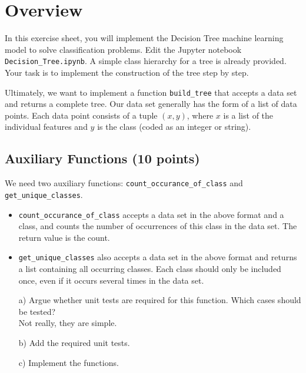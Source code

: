 \def\firstname{Tim}
\def\lastname{Dahmen}
\def\aufgabenblatt{2}




\thispagestyle{page1} 

\section{Overview}

In this exercise sheet, you will implement the Decision Tree machine learning model to solve classification problems. 
Edit the Jupyter notebook \texttt{Decision\_Tree.ipynb}. A simple class hierarchy for a tree is already provided.
Your task is to implement the construction of the tree step by step. 

Ultimately, we want to implement a function \texttt{build\_tree} that accepts a data set and returns a complete tree. 
Our data set generally has the form of a list of data points. Each data point consists of a tuple $(x,y)$, where $x$ is a list of the individual features and $y$ is the class (coded as an integer or string). 

\subsection{Auxiliary Functions (10 points)}

We need two auxiliary functions: \texttt{count\_occurance\_of\_class} and \texttt{get\_unique\_classes}. 

\begin{itemize}
\item \texttt{count\_occurance\_of\_class} accepts a data set in the above format and a class, and counts the number of occurrences of this class in the data set. The return value is the count.
\item \texttt{get\_unique\_classes} also accepts a data set in the above format and returns a list containing all occurring classes. Each class should only be included once, even if it occurs several times in the data set. 
\end{itemize}

\begin{enumerate}

\item[a)] Argue whether unit tests are required for this function. Which cases should be tested?\\
Not really, they are simple.

\item[b)] Add the required unit tests.

\item[c)] Implement the functions.

\end{enumerate}

